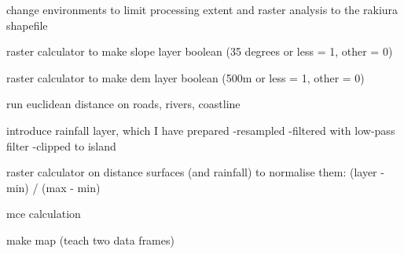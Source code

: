 \documentclass{article}
\begin{document}
change environments to limit processing extent and raster analysis to the rakiura shapefile

raster calculator to make slope layer boolean (35 degrees or less = 1, other = 0)

raster calculator to make dem layer boolean (500m or less = 1, other = 0)

run euclidean distance on roads, rivers, coastline

introduce rainfall layer, which I have prepared
-resampled
-filtered with low-pass filter
-clipped to island

raster calculator on distance surfaces (and rainfall) to normalise them: (layer - min) / (max - min)

mce calculation

make map (teach two data frames)
\end{document}
